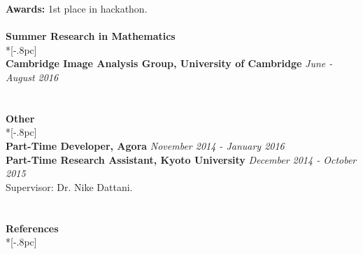 \documentclass{article}
\begin{document}
\textbf{Awards:} 1st place in hackathon.\\
\\
{\bf Summer Research in Mathematics} \\*[-.8pc]
\underline{\hspace{2.5in}} \\
{\bf Cambridge Image Analysis Group, University of Cambridge} \hfill {\it June - August 2016\/} \\
\\
\\
{\bf Other } \\*[-.8pc]
\underline{\hspace{0.45in}} \\
{\bf Part-Time Developer, Agora} \hfill {\it November 2014 - January 2016 \/} \\
{\bf Part-Time Research Assistant, Kyoto University} \hfill {\it December 2014 - October 2015\/} \\
Supervisor: Dr. Nike Dattani. \\
\\
\\
{\large \bf References} \\*[-.8pc]
\underline{\hspace{6in}} \\
\end{document}
